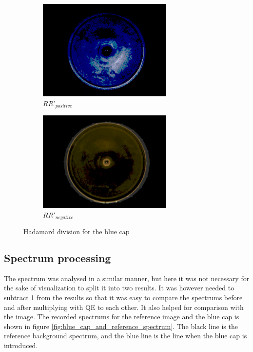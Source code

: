 \begin{figure}[h]
        \begin{subfigure}{0.5\textwidth}
            \includegraphics[width=0.9\linewidth, height=5cm]{figures/processed_camera_pictures/002_blue_cap_positive_difference.png}
            \caption{$RR'_{positive}$}
            \label{fig:002_blue_cap_positive_difference}
        \end{subfigure}%
        \begin{subfigure}{0.5\textwidth}
            \includegraphics[width=0.9\linewidth, height=5cm]{figures/processed_camera_pictures/002_blue_cap_negative_difference.png} 
            \caption{$RR'_{negative}$}
            \label{fig:002_blue_cap_negative_difference}
    \end{subfigure}
    
    \caption{Hadamard division for the blue cap}
    \label{fig:hadamard_division_blue_cap}
\end{figure}

\subsection{Spectrum processing}

The spectrum was analysed in a similar manner, but here it was not necessary for the sake of visualization to split it into two results. It was however needed to subtract 1 from the results so that it was easy to compare the spectrums before and after multiplying with QE to each other. It also helped for comparison with the image. 
The recorded spectrums for the reference image and the blue cap is shown in figure \ref{fig:blue_cap_and_reference_spectrum}. The black line is the reference background spectrum, and the blue line is the line when the blue cap is introduced. 

